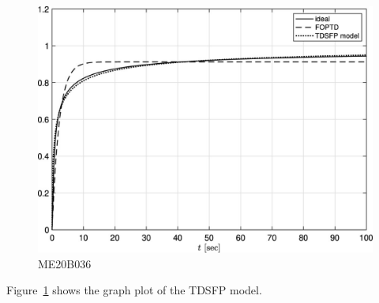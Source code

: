 \documentclass[a4paper, 12pt]{article}
\begin{document}
\begin{figure}[h]
	\begin{center}
		\includegraphics[scale=0.3]{Assgt4.eps}
	\end{center}
	\caption{ME20B036}
	\label{f1:image}
\end{figure}


Figure~\ref{f1:image} shows the graph plot of the TDSFP model.~\cite{YUAN2022108111}

%
%
\end{document}
